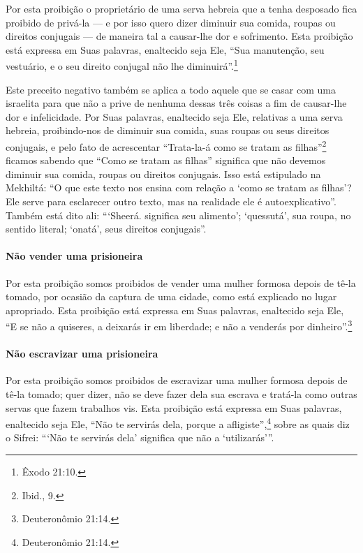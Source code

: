 Por esta proibição o proprietário de uma serva hebreia que a tenha
desposado fica proibido de privá-la --- e por isso quero dizer diminuir
sua comida, roupas ou direitos conjugais --- de maneira tal a
causar-lhe dor e sofrimento. Esta proibição está expressa em Suas
palavras, enaltecido seja Ele, ``Sua manutenção, seu vestuário, e o seu
direito conjugal não lhe diminuirá''.\footnote{Êxodo 21:10.}

Este preceito negativo também se aplica a todo aquele que se casar com
uma israelita para que não a prive de nenhuma dessas três coisas a fim
de causar-lhe dor e infelicidade. Por Suas palavras, enaltecido seja Ele,
relativas a uma serva hebreia, proibindo-nos de diminuir sua comida,
suas roupas ou seus direitos conjugais, e pelo fato de acrescentar
``Trata-la-á como se tratam as filhas''\footnote{Ibid., 9.} ficamos sabendo que
``Como se tratam as filhas'' significa que não devemos diminuir sua
comida, roupas ou direitos conjugais. Isso está estipulado na Mekhiltá:
``O que este texto nos ensina com relação a `como se tratam as filhas'?
Ele serve para esclarecer outro texto, mas na realidade ele é
autoexplicativo''. Também está dito ali: ```Sheerá.
significa seu alimento'; `quessutá', sua roupa, no sentido literal;
`onatá', seus direitos conjugais''.

\paragraph{Não vender uma prisioneira}

Por esta proibição somos proibidos de vender uma mulher formosa depois
de tê-la tomado, por ocasião da captura de uma cidade, como está
explicado no lugar apropriado. Esta proibição está expressa em Suas
palavras, enaltecido seja Ele, ``E se não a quiseres, a deixarás ir em
liberdade; e não a venderás por dinheiro''.\footnote{Deuteronômio 21:14.}

\paragraph{Não escravizar uma prisioneira}

Por esta proibição somos proibidos de escravizar uma mulher formosa
depois de tê-la tomado; quer dizer, não se deve fazer dela sua escrava e
tratá-la como outras servas que fazem trabalhos vis. Esta proibição está
expressa em Suas palavras, enaltecido seja Ele, ``Não te servirás dela,
porque a afligiste'',\footnote{Deuteronômio 21:14.} sobre as quais diz o Sifrei:
```Não te servirás dela' significa que não a `utilizarás'''.

